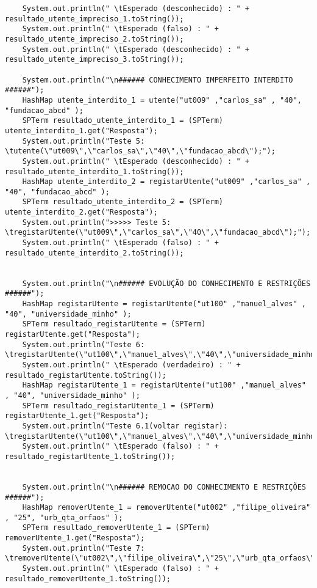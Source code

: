 \documentclass[
  oneside,
  10pt, a4paper,
  footinclude=true,
  headinclude=true,
  cleardoublepage=empty
]{scrbook}
\begin{document}
\begin{lstlisting}
    System.out.println(" \tEsperado (desconhecido) : " + resultado_utente_impreciso_1.toString());
    System.out.println(" \tEsperado (falso) : " + resultado_utente_impreciso_2.toString());
    System.out.println(" \tEsperado (desconhecido) : " + resultado_utente_impreciso_3.toString());

    System.out.println("\n###### CONHECIMENTO IMPERFEITO INTERDITO ######");
    HashMap utente_interdito_1 = utente("ut009" ,"carlos_sa" , "40", "fundacao_abcd" );
    SPTerm resultado_utente_interdito_1 = (SPTerm) utente_interdito_1.get("Resposta");
    System.out.println("Teste 5: \tutente(\"ut009\",\"carlos_sa\",\"40\",\"fundacao_abcd\");");
    System.out.println(" \tEsperado (desconhecido) : " + resultado_utente_interdito_1.toString());
    HashMap utente_interdito_2 = registarUtente("ut009" ,"carlos_sa" , "40", "fundacao_abcd" );
    SPTerm resultado_utente_interdito_2 = (SPTerm) utente_interdito_2.get("Resposta");
    System.out.println(">>>>> Teste 5: \tregistarUtente(\"ut009\",\"carlos_sa\",\"40\",\"fundacao_abcd\");");
    System.out.println(" \tEsperado (falso) : " + resultado_utente_interdito_2.toString());


    System.out.println("\n###### EVOLUÇÃO DO CONHECIMENTO E RESTRIÇÕES ######");
    HashMap registarUtente = registarUtente("ut100" ,"manuel_alves" , "40", "universidade_minho" );
    SPTerm resultado_registarUtente = (SPTerm) registarUtente.get("Resposta");
    System.out.println("Teste 6: \tregistarUtente(\"ut100\",\"manuel_alves\",\"40\",\"universidade_minho\");");
    System.out.println(" \tEsperado (verdadeiro) : " + resultado_registarUtente.toString());
    HashMap registarUtente_1 = registarUtente("ut100" ,"manuel_alves" , "40", "universidade_minho" );
    SPTerm resultado_registarUtente_1 = (SPTerm) registarUtente_1.get("Resposta");
    System.out.println("Teste 6.1(voltar registar): \tregistarUtente(\"ut100\",\"manuel_alves\",\"40\",\"universidade_minho\");");
    System.out.println(" \tEsperado (falso) : " + resultado_registarUtente_1.toString());


    System.out.println("\n###### REMOCAO DO CONHECIMENTO E RESTRIÇÕES ######");
    HashMap removerUtente_1 = removerUtente("ut002" ,"filipe_oliveira" , "25", "urb_qta_orfaos" );
    SPTerm resultado_removerUtente_1 = (SPTerm) removerUtente_1.get("Resposta");
    System.out.println("Teste 7: \tremoverUtente(\"ut002\",\"filipe_oliveira\",\"25\",\"urb_qta_orfaos\");");
    System.out.println(" \tEsperado (falso) : " + resultado_removerUtente_1.toString());



\end{lstlisting}
\end{document}

